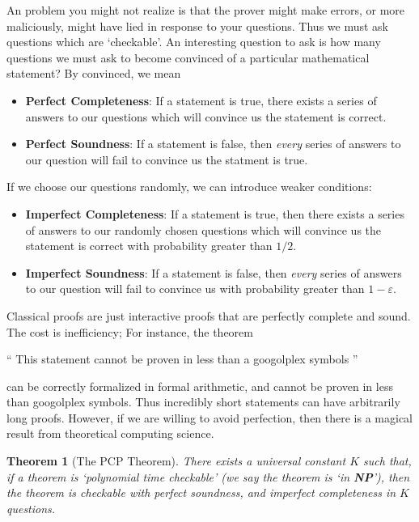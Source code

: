 \documentclass{article}
\theoremstyle{plain}
\newtheorem{theorem}{Theorem}
\theoremstyle{definition}
\begin{document}
An problem you might not realize is that the prover might make errors, or more maliciously, might have lied in response to your questions. Thus we must ask questions which are `checkable'. An interesting question to ask is how many questions we must ask to become convinced of a particular mathematical statement? By convinced, we mean
%
\begin{itemize}
    \item {\bf Perfect Completeness}: If a statement is true, there exists a series of answers to our questions which will convince us the statement is correct.

    \item {\bf Perfect Soundness}: If a statement is false, then {\it every} series of answers to our question will fail to convince us the statment is true.
\end{itemize}
%
If we choose our questions randomly, we can introduce weaker conditions:
%
\begin{itemize}
    \item {\bf Imperfect Completeness}: If a statement is true, then there exists a series of answers to our randomly chosen questions which will convince us the statement is correct with probability greater than $1/2$.

    \item {\bf Imperfect Soundness}: If a statement is false, then {\it every} series of answers to our question will fail to convince us with probability greater than $1 - \varepsilon$.
\end{itemize}
%
Classical proofs are just interactive proofs that are perfectly complete and sound. The cost is inefficiency; For instance, the theorem
%
\begin{center} `` This statement cannot be proven in less than a googolplex symbols '' \end{center}
%
can be correctly formalized in formal arithmetic, and cannot be proven in less than googolplex symbols. Thus incredibly short statements can have arbitrarily long proofs. However, if we are willing to avoid perfection, then there is a magical result from theoretical computing science.

\begin{theorem}[The PCP Theorem]
    There exists a universal constant $K$ such that, if a theorem is `polynomial time checkable' (we say the theorem is `in {\bf NP}'), then the theorem is checkable with perfect soundness, and imperfect completeness in $K$ questions.
\end{theorem}
\end{document}

